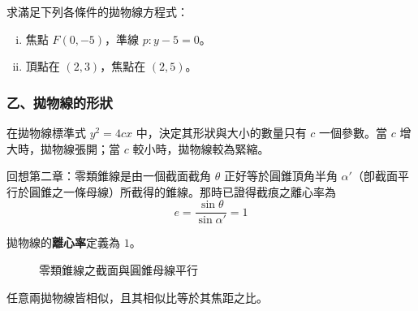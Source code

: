 \begin{exercise}
求滿足下列各條件的拋物線方程式：
\begin{enumerate}[(i)]
  \item 焦點 $F(0,-5)$，準線 $p: y - 5 = 0$。
  \item 頂點在 $(2,3)$，焦點在 $(2,5)$。
\end{enumerate}
\end{exercise}

\subsubsection*{乙、拋物線的形狀}

在拋物線標準式 $y^2 = 4cx$ 中，決定其形狀與大小的數量只有 $c$ 一個參數。當 $c$ 增大時，拋物線張開；當 $c$ 較小時，拋物線較為緊縮。

回想第二章：零類錐線是由一個截面截角 $\theta$ 正好等於圓錐頂角半角 $\alpha'$（卽截面平行於圓錐之一條母線）所截得的錐線。那時已證得截痕之離心率為
\[ e = \frac{\sin\theta}{\sin\alpha'} = 1 \]

\begin{definition*}
拋物線的\textbf{離心率}定義為 $1$。
\end{definition*}

\begin{figure}[htbp]
\centering
{}
\caption{零類錐線之截面與圓錐母線平行}
\label{fig:b4s-3-22}
\end{figure}

\begin{proposition}
任意兩拋物線皆相似，且其相似比等於其焦距之比。
\end{proposition}

